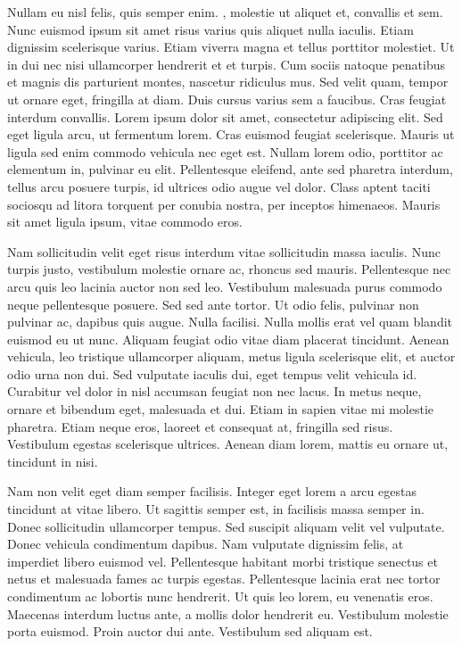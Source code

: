 \documentclass{EPUProjetDi}
\begin{document}
Nullam eu nisl felis, quis semper enim. , molestie ut aliquet et, convallis et sem. Nunc euismod ipsum sit amet risus varius quis aliquet nulla iaculis. Etiam dignissim scelerisque varius. Etiam viverra magna et tellus porttitor molestiet. Ut in dui nec nisi ullamcorper hendrerit et et turpis. Cum sociis natoque penatibus et magnis dis parturient montes, nascetur ridiculus mus. Sed velit quam, tempor ut ornare eget, fringilla at diam. Duis cursus varius sem a faucibus. Cras feugiat interdum convallis. Lorem ipsum dolor sit amet, consectetur adipiscing elit. Sed eget ligula arcu, ut fermentum lorem. Cras euismod feugiat scelerisque. Mauris ut ligula sed enim commodo vehicula nec eget est. Nullam lorem odio, porttitor ac elementum in, pulvinar eu elit. Pellentesque eleifend, ante sed pharetra interdum, tellus arcu posuere turpis, id ultrices odio augue vel dolor. Class aptent taciti sociosqu ad litora torquent per conubia nostra, per inceptos himenaeos. Mauris sit amet ligula ipsum, vitae commodo eros.

Nam sollicitudin velit eget risus interdum vitae sollicitudin massa iaculis. Nunc turpis justo, vestibulum molestie ornare ac, rhoncus sed mauris. Pellentesque nec arcu quis leo lacinia auctor non sed leo. Vestibulum malesuada purus commodo neque pellentesque posuere. Sed sed ante tortor. Ut odio felis, pulvinar non pulvinar ac, dapibus quis augue. Nulla facilisi. Nulla mollis erat vel quam blandit euismod eu ut nunc. Aliquam feugiat odio vitae diam placerat tincidunt. Aenean vehicula, leo tristique ullamcorper aliquam, metus ligula scelerisque elit, et auctor odio urna non dui. Sed vulputate iaculis dui, eget tempus velit vehicula id. Curabitur vel dolor in nisl accumsan feugiat non nec lacus. In metus neque, ornare et bibendum eget, malesuada et dui. Etiam in sapien vitae mi molestie pharetra. Etiam neque eros, laoreet et consequat at, fringilla sed risus. Vestibulum egestas scelerisque ultrices. Aenean diam lorem, mattis eu ornare ut, tincidunt in nisi.


Nam non velit eget diam semper facilisis. Integer eget lorem a arcu egestas tincidunt at vitae libero. Ut sagittis semper est, in facilisis massa semper in. Donec sollicitudin ullamcorper tempus. Sed suscipit aliquam velit vel vulputate. Donec vehicula condimentum dapibus. Nam vulputate dignissim felis, at imperdiet libero euismod vel. Pellentesque habitant morbi tristique senectus et netus et malesuada fames ac turpis egestas. Pellentesque lacinia erat nec tortor condimentum ac lobortis nunc hendrerit. Ut quis leo lorem, eu venenatis eros. Maecenas interdum luctus ante, a mollis dolor hendrerit eu. Vestibulum molestie porta euismod. Proin auctor dui ante. Vestibulum sed aliquam est.
\end{document}
